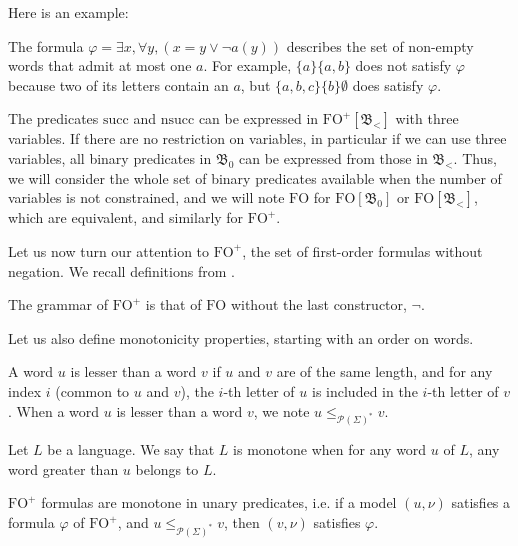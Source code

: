 \documentclass[a4paper,UKenglish,cleveref, autoref, thm-restate]{lipics-v2021}
\renewcommand{\alph}{\part(\Sigma)}
\newcommand{\FO}{\mathrm{FO}}
\newcommand{\FOp}{\FO^+}
\renewcommand{\part}{\mathcal{P}}
\renewcommand{\succ}{\mathrm{succ}}
\renewcommand{\nsucc}{\mathrm{nsucc}}
\newcommand{\val}{\nu}
\newcommand{\bin}{\mathfrak{B}}
\newcommand{\leqa}{\leq_{\alph^*}}
\begin{document}
Here is an example:

\begin{example}
    The formula $\varphi = \exists x, \forall y, (x=y \lor \neg a(y))$ describes the set of non-empty words that admit at most one $a$. For example, $\{a\}\{a,b\}$ does not satisfy $\varphi$ because two of its letters contain an $a$, but $\{a,b,c\}\{b\}\emptyset$ does satisfy $\varphi$.
\end{example}

\begin{remark}
    The predicates $\succ$ and $\nsucc$ can be expressed in $\FOp[\bin_<]$ with three variables. If there are no restriction on variables, in particular if we can use three variables, all binary predicates in $\bin_0$ can be expressed from those in $\bin_<$. Thus, we will consider the whole set of binary predicates available when the number of variables is not constrained, and we will note $\FO$ for $\FO[\bin_0]$ or $\FO[\bin_<]$, which are equivalent, and similarly for $\FOp$.
\end{remark}

Let us now turn our attention to $\FOp$, the set of first-order formulas without negation. We recall definitions from \cite{PFO}.

\begin{definition}
    The grammar of $\FOp$ is that of $\FO$ without the last constructor, $\neg$.
\end{definition}




Let us also define monotonicity properties, starting with an order on words.

\begin{definition}
    A word $u$ is lesser than a word $v$ if $u$ and $v$ are of the same length, and for any index $i$ (common to $u$ and $v$), the $i$-th letter of $u$ is included in the $i$-th letter of $v$.
    When a word $u$ is lesser than a word $v$, we note $u \leqa v$.
\end{definition}


\begin{definition}
    Let $L$ be a language.
    We say that $L$ is monotone when for any word $u$ of $L$, any word greater than $u$ belongs to $L$.
\end{definition}


\begin{proposition}
        $\FOp$ formulas are monotone in unary predicates, i.e. if a model $(u,\val)$ satisfies a formula $\varphi$ of $\FOp$, and $u \leqa v$, then $(v,\val)$ satisfies $\varphi$.
\end{proposition}
\end{document}
